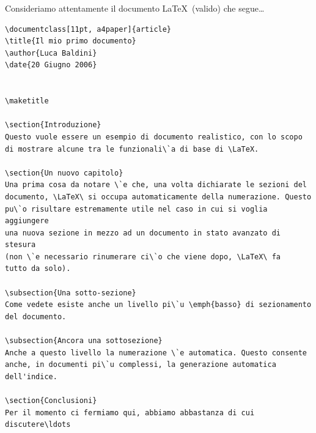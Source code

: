 Consideriamo attentamente il documento \LaTeX\ (valido) che segue\ldots

\begin{verbatim}
\documentclass[11pt, a4paper]{article}
\title{Il mio primo documento}
\author{Luca Baldini}
\date{20 Giugno 2006}


\maketitle

\section{Introduzione}
Questo vuole essere un esempio di documento realistico, con lo scopo
di mostrare alcune tra le funzionali\`a di base di \LaTeX.

\section{Un nuovo capitolo}
Una prima cosa da notare \`e che, una volta dichiarate le sezioni del
documento, \LaTeX\ si occupa automaticamente della numerazione. Questo
pu\`o risultare estremamente utile nel caso in cui si voglia aggiungere
una nuova sezione in mezzo ad un documento in stato avanzato di stesura
(non \`e necessario rinumerare ci\`o che viene dopo, \LaTeX\ fa
tutto da solo). 

\subsection{Una sotto-sezione}
Come vedete esiste anche un livello pi\`u \emph{basso} di sezionamento
del documento.

\subsection{Ancora una sottosezione}
Anche a questo livello la numerazione \`e automatica. Questo consente
anche, in documenti pi\`u complessi, la generazione automatica dell'indice.

\section{Conclusioni}
Per il momento ci fermiamo qui, abbiamo abbastanza di cui discutere\ldots


\end{verbatim}

